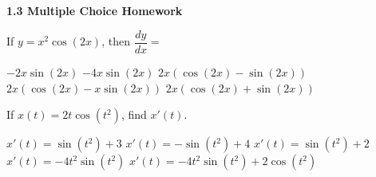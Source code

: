  \\[11pt]
 \\[11pt]
 \\[11pt]
 \\[11pt]

\textbf{\large{1.3 Multiple Choice Homework}} \par

\begin{questions}
    \question If $y = x^2\cos (2x)$, then $\dfrac{dy}{dx} = $ \\

    \begin{oneparchoices}
        \choice $-2x\sin (2x)$
        \choice $-4x\sin (2x)$
        \choice $2x\left(\cos (2x) - \sin (2x)\right)$ \\[11pt]
        \makebox[0.17 \textwidth] \choice $2x\left(\cos (2x) - x\sin (2x)\right)$
        \makebox[0.2 \textwidth] \choice $2x\left(\cos (2x) + \sin (2x)\right)$
    \end{oneparchoices} \par \horizontalline

    \question If $x(t) = 2t\cos \left(t^2\right)$, find $x'(t)$. \\

    \begin{oneparchoices}
        \choice $x'(t) = \sin \left(t^2\right) + 3$
        \choice $x'(t) = -\sin \left(t^2\right) + 4$ 
        \choice $x'(t) = \sin \left(t^2\right) + 2$ \\[11pt]
        \makebox[0.14 \textwidth] \choice $x'(t) = -4t^2\sin \left(t^2\right)$ 
        \makebox[0.15 \textwidth] \choice $x'(t) = -4t^2\sin \left(t^2\right) + 2\cos \left(t^2\right)$ 
    \end{oneparchoices} \par \horizontalline

\end{questions}






